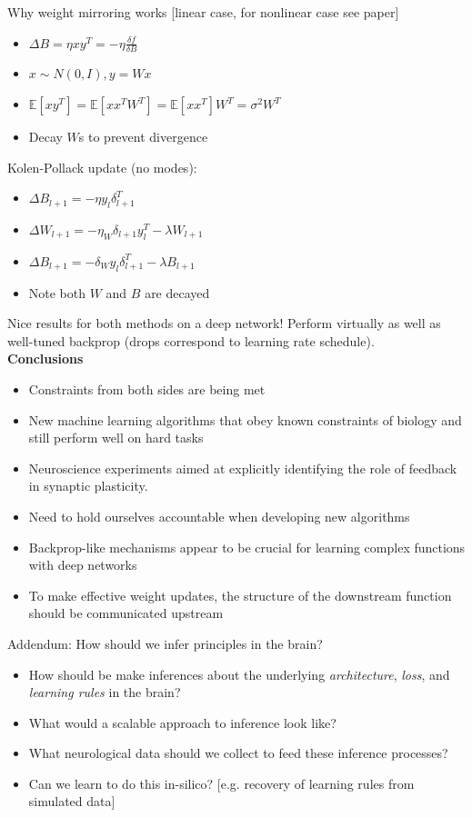 \documentclass[12pt]{article}
\begin{document}
Why weight mirroring works [linear case, for nonlinear case see paper]
\begin{itemize}
\item $\Delta B = \eta xy^T = -\eta \frac{\delta f}{\delta B}$
\item $x \sim N(0,I), y = Wx$
\item $\mathbb{E}[xy^T] = \mathbb{E}[xx^TW^T] = \mathbb{E}[xx^T]W^T = \sigma^2 W^T$
\item Decay $W$s to prevent divergence
\end{itemize}

Kolen-Pollack update (no modes): 
\begin{itemize}
    \item $\Delta B_{l+1} = -\eta y_l \delta_{l+1}^T$
    \item $\Delta W_{l+1} = -\eta_W \delta_{l+1} y_l^T - \lambda W_{l+1}$
    \item $\Delta B_{l+1} = -\delta_W y_l \delta_{l+1}^T - \lambda B_{l+1}$
    \item Note both $W$ and $B$ are decayed
\end{itemize}

Nice results for both methods on a deep network! Perform virtually as well as well-tuned backprop (drops correspond to learning rate schedule). \\

\textbf{Conclusions} 
\begin{itemize}
    \item Constraints from both sides are being met
    \item New machine learning algorithms that obey known constraints of biology and still perform well on hard tasks 
    \item Neuroscience experiments aimed at explicitly identifying the role of feedback in synaptic plasticity.
    \item Need to hold ourselves accountable when developing new algorithms
    \item Backprop-like mechanisms appear to be crucial for learning complex functions with deep networks
    \item To make effective weight updates, the structure of the downstream function should be communicated upstream
\end{itemize}

Addendum: How should we infer principles in the brain?
\begin{itemize}
    \item How should be make inferences about the underlying \textit{architecture}, \textit{loss}, and \textit{learning rules} in the brain?
    \item What would a scalable approach to inference look like?
    \item What neurological data should we collect to feed these inference processes?
    \item Can we learn to do this in-silico? [e.g. recovery of learning rules from simulated data]
\end{itemize}
\end{document}
